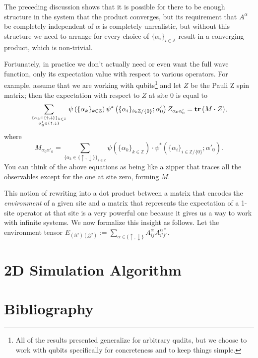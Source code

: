 \documentclass{report}
\newcommand{\paren}[1]{\left(#1\right)}
\newcommand{\tr}{\text{\textbf{tr}}\,}
\newcommand{\Z}{\mathbb{Z}}
\begin{document}
The preceding discussion shows that it is possible for there to be enough structure in the system that the product converges, but its requirement that $A^\alpha$ be completely independent of $\alpha$ is completely unrealistic, but without this structure we need to arrange for every choice of $\{\alpha_i\}_{i\in\Z}$ result in a converging product, which is non-trivial.

Fortunately, in practice we don't actually need or even want the full wave function, only its expectation value with respect to various operators.  For example, assume that we are working with qubits\footnote{All of the results presented generalize for arbitrary qudits, but we choose to work with qubits specifically for concreteness and to keep things simple.} and let $Z$ be the Pauli Z spin matrix;  then the expectation with respect to $Z$ at site 0 is equal to
$$\sum_{\{\alpha_k\in\{\uparrow,\downarrow\}\}_{k\in\Z}\atop\alpha'_0\in\{\uparrow,\downarrow\}}\psi\paren{\{\alpha_k\}_{k\in\Z}}\psi^*\paren{\{\alpha_i\}_{i\in\Z/\{0\}};\alpha'_0} Z_{\alpha_0\alpha'_0}=\tr(M\cdot Z),$$ where $$M_{\alpha_0\alpha'_0}=\sum_{\{\alpha_k\in\{\uparrow,\downarrow\}\}_{k\in\Z}}\psi\paren{\{\alpha_k\}_{k\in\Z}}\cdot\psi^*\paren{\{\alpha_i\}_{i\in\Z/\{0\}};\alpha'_0}.$$
You can think of the above equations as being like a zipper that traces all the observables except for the one at site zero, forming $M$.

This notion of rewriting into a dot product between a matrix that encodes the \emph{environment} of a given site and a matrix that represents the expectation of a 1-site operator at that site is a very powerful one because it gives us a way to work with infinite systems.  We now formalize this insight as follows.  Let the environment tensor $E_{(ii')(jj')}:=\sum_{\alpha\in\{\uparrow,\downarrow\}}A^\alpha_{ij}A^{\alpha*}_{i'j'}.$

\part{2D Simulation Algorithm}
\label{2dsim}

\part*{Bibliography}



\end{document}
